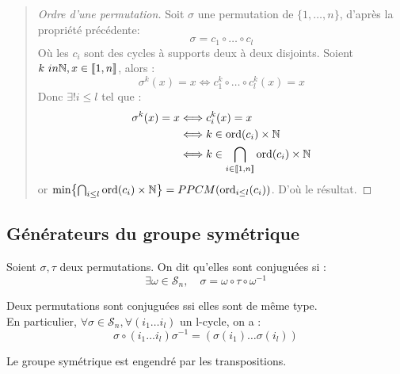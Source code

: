\begin{quote}
\footnotesize 
\begin{proof}[Ordre d'une permutation]
		Soit $\sigma$ une permutation de $\{1,\dots,n\}$, d'après la propriété précédente:
		\[ \sigma = c_1 \circ \dots \circ c_l \]
		Où les $c_i$ sont des cycles à supports deux à deux disjoints. Soient $k \ in \mathbb{N}, x \in \llbracket 1, n \rrbracket$, alors :
			\[ \sigma^k (x) = x \Leftrightarrow c_1^k \circ \dots \circ c_l^k(x) = x \]
		Donc $ \exists! i \leq l $ tel que :
		\begin{align*}
			\sigma^k (x) = x & \Longleftrightarrow c_i^k(x) = x \\
						& \Longleftrightarrow k \in \text{ord}(c_i) \times \mathbb{N} \\
						& \Longleftrightarrow k \in \bigcap_{i \in \llbracket 1, n \rrbracket} \text{ord}(c_i) \times \mathbb{N} 
		\end{align*}
		or $ \min \bigl\{ \bigcap_{i \leq l} \text{ord}(c_i) \times \mathbb{N} \bigr\} = PPCM(\text{ord}_{i \leq l}(c_i))$.
		D'où le résultat.
\end{proof}
\normalsize
\end{quote}

\subsection{Générateurs du groupe symétrique}

\begin{definition}[Conjugaison]
		Soient $\sigma, \tau$ deux permutations. On dit qu'elles sont conjuguées si :
		\[ \boxed{ \exists \omega \in \mathcal{S}_n, \quad \sigma = \omega \circ \tau \circ \omega ^{-1} } \]
\end{definition}

\begin{prop}
		Deux permutations sont conjuguées ssi elles sont de même type. \\ 
		En particulier, $\forall \sigma \in \mathcal{S}_n, \forall (i_1 \dots i_l)$ un l-cycle, on a :
			\[ \sigma \circ (i_1 \dots i_l) \sigma^{-1} = (\sigma(i_1) \dots \sigma(i_l)) \]
\end{prop}

\begin{theorem}
		Le groupe symétrique est engendré par les transpositions.
\end{theorem}


